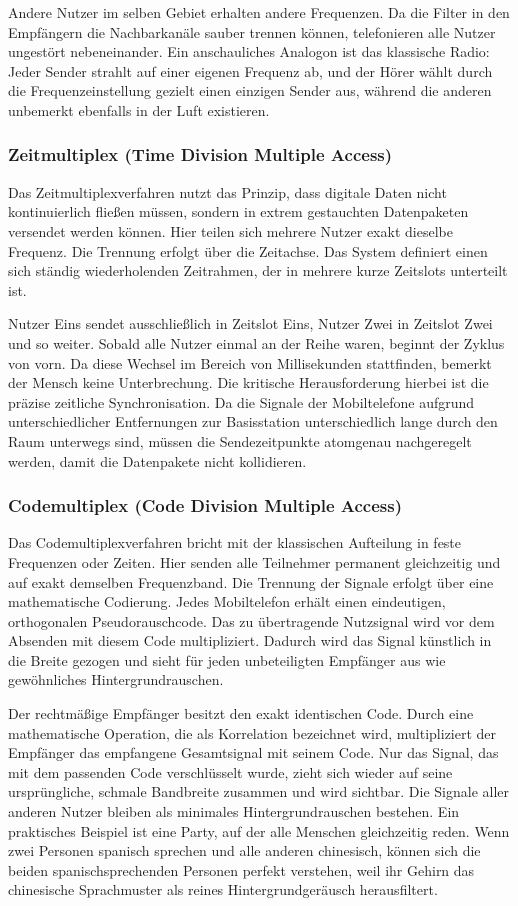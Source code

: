 \documentclass[11pt,a4paper]{article}
\begin{document}
Andere Nutzer im selben Gebiet erhalten andere Frequenzen. Da die Filter in den Empfängern die Nachbarkanäle sauber trennen können, telefonieren alle Nutzer ungestört nebeneinander. Ein anschauliches Analogon ist das klassische Radio: Jeder Sender strahlt auf einer eigenen Frequenz ab, und der Hörer wählt durch die Frequenzeinstellung gezielt einen einzigen Sender aus, während die anderen unbemerkt ebenfalls in der Luft existieren.

\subsubsection{Zeitmultiplex (Time Division Multiple Access)}
Das Zeitmultiplexverfahren nutzt das Prinzip, dass digitale Daten nicht kontinuierlich fließen müssen, sondern in extrem gestauchten Datenpaketen versendet werden können. Hier teilen sich mehrere Nutzer exakt dieselbe Frequenz. Die Trennung erfolgt über die Zeitachse. Das System definiert einen sich ständig wiederholenden Zeitrahmen, der in mehrere kurze Zeitslots unterteilt ist.

Nutzer Eins sendet ausschließlich in Zeitslot Eins, Nutzer Zwei in Zeitslot Zwei und so weiter. Sobald alle Nutzer einmal an der Reihe waren, beginnt der Zyklus von vorn. Da diese Wechsel im Bereich von Millisekunden stattfinden, bemerkt der Mensch keine Unterbrechung. Die kritische Herausforderung hierbei ist die präzise zeitliche Synchronisation. Da die Signale der Mobiltelefone aufgrund unterschiedlicher Entfernungen zur Basisstation unterschiedlich lange durch den Raum unterwegs sind, müssen die Sendezeitpunkte atomgenau nachgeregelt werden, damit die Datenpakete nicht kollidieren.

\subsubsection{Codemultiplex (Code Division Multiple Access)}
Das Codemultiplexverfahren bricht mit der klassischen Aufteilung in feste Frequenzen oder Zeiten. Hier senden alle Teilnehmer permanent gleichzeitig und auf exakt demselben Frequenzband. Die Trennung der Signale erfolgt über eine mathematische Codierung. Jedes Mobiltelefon erhält einen eindeutigen, orthogonalen Pseudorauschcode. Das zu übertragende Nutzsignal wird vor dem Absenden mit diesem Code multipliziert. Dadurch wird das Signal künstlich in die Breite gezogen und sieht für jeden unbeteiligten Empfänger aus wie gewöhnliches Hintergrundrauschen.

Der rechtmäßige Empfänger besitzt den exakt identischen Code. Durch eine mathematische Operation, die als Korrelation bezeichnet wird, multipliziert der Empfänger das empfangene Gesamtsignal mit seinem Code. Nur das Signal, das mit dem passenden Code verschlüsselt wurde, zieht sich wieder auf seine ursprüngliche, schmale Bandbreite zusammen und wird sichtbar. Die Signale aller anderen Nutzer bleiben als minimales Hintergrundrauschen bestehen. Ein praktisches Beispiel ist eine Party, auf der alle Menschen gleichzeitig reden. Wenn zwei Personen spanisch sprechen und alle anderen chinesisch, können sich die beiden spanischsprechenden Personen perfekt verstehen, weil ihr Gehirn das chinesische Sprachmuster als reines Hintergrundgeräusch herausfiltert.
\end{document}
